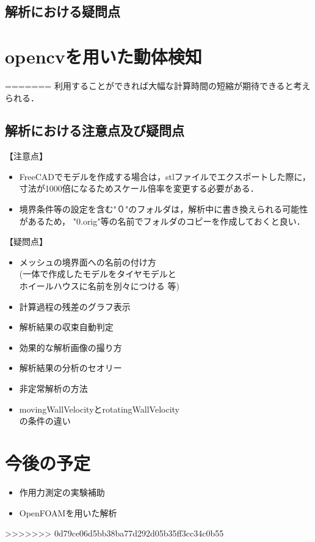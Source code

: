 \documentclass[twocolumn,a4j]{jsarticle}
\begin{document}
\subsection{解析における疑問点}
\section{\large opencvを用いた動体検知}
=======
利用することができれば大幅な計算時間の短縮が期待できると考えられる．\\
\subsection{解析における注意点及び疑問点}
\noindent【注意点】
\begin{itemize}
    \item FreeCADでモデルを作成する場合は，stlファイルでエクスポートした際に，
          寸法が1000倍になるためスケール倍率を変更する必要がある．
    \item 境界条件等の設定を含む"０"のフォルダは，解析中に書き換えられる可能性があるため，
          "0.orig"等の名前でフォルダのコピーを作成しておくと良い．
\end{itemize}
\noindent【疑問点】
\begin{itemize}
    \item メッシュの境界面への名前の付け方\\
          (一体で作成したモデルをタイヤモデルと\\ \quad ホイールハウスに名前を別々につける 等)
    \item 計算過程の残差のグラフ表示
    \item 解析結果の収束自動判定
    \item 効果的な解析画像の撮り方
    \item 解析結果の分析のセオリー
    \item 非定常解析の方法
    \item movingWallVelocityとrotatingWallVelocity\\の条件の違い
\end{itemize}
\section{今後の予定}
\begin{itemize}
    \item 作用力測定の実験補助
    \item OpenFOAMを用いた解析
\end{itemize}
>>>>>>> 0d79ce06d5bb38ba77d292d05b35ff3cc34c0b55
\end{document}
